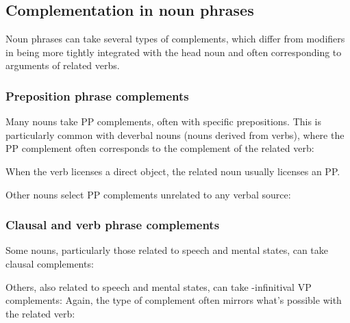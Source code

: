 \subsection{Complementation in noun phrases}

Noun phrases can take several types of complements, which differ from modifiers in being more tightly integrated with the head noun and often corresponding to arguments of related verbs.

\subsubsection{Preposition phrase complements}

Many nouns take PP complements, often with specific prepositions. This is particularly common with deverbal nouns (nouns derived from verbs), where the PP complement often corresponds to the complement of the related verb:

\ea
    \z
\z
\noindent When the verb licenses a direct object, the related noun usually licenses an  PP.

\ea
    \z
\z
\noindent Other nouns select PP complements unrelated to any verbal source:

\ea
    \z
\z

\subsubsection{Clausal and verb phrase complements}

Some nouns, particularly those related to speech and mental states, can take clausal complements:

\ea
    \z
\z
\noindent Others, also related to speech and mental states, can take -infinitival VP complements:
\ea
    \z
\z
\noindent Again, the type of complement often mirrors what's possible with the related verb:

